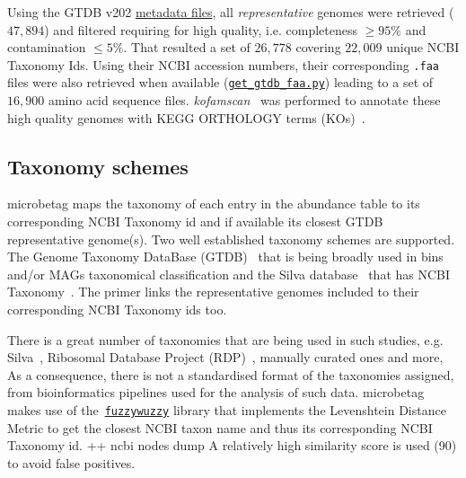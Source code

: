 \documentclass[sn-mathphys,Numbered]{sn-jnl}%
\theoremstyle{thmstyleone}%
\theoremstyle{thmstyletwo}%
\theoremstyle{thmstylethree}%
\begin{document}
        Using the GTDB v202 \href{https://data.gtdb.ecogenomic.org/releases/release202/202.0/}{metadata files}, 
        all \textit{representative} genomes were retrieved ($47,894$) and filtered requiring for high quality, i.e. completeness $\geq 95\%$  and contamination $\leq 5\%$.
        That resulted a set of $26,778$ covering $22,009$ unique NCBI Taxonomy Ids.
        Using their NCBI accession numbers, their corresponding \texttt{.faa} files were also retrieved when available 
        (\href{https://github.com/hariszaf/microbetag/blob/develop/microbetagDB/mappings/gtdb_ncbi/get_gtdb_faa.py}{\texttt{get\_gtdb\_faa.py}}) 
        leading to a set of $16,900$ amino acid sequence files.
        \textit{kofamscan}~\cite{aramaki2020kofamkoala} was performed to annotate these high quality genomes with KEGG ORTHOLOGY terms (KOs)~\cite{kanehisa2012kegg}.


    \subsection*{Taxonomy schemes}
        \label{subsec:taxonomies}

        microbetag maps the taxonomy of each entry in the abundance table to its corresponding NCBI Taxonomy id and if available its closest GTDB representative genome(s).
        Two well established taxonomy schemes are supported.
        The Genome Taxonomy DataBase (GTDB)~\cite{parks2022gtdb} that is being broadly used in bins and/or MAGs taxonomical classification
        and the Silva database~\cite{quast2012silva} that has 
        NCBI Taxonomy~\cite{schoch2020ncbi}. 
        The primer links the representative genomes included to their corresponding NCBI Taxonomy ids too. 
        
        There is a great number of taxonomies that are being used in such studies, e.g. Silva~\cite{quast2012silva}, Ribosomal Database Project (RDP)~\cite{cole2014ribosomal}, manually curated ones and more, 
        As a consequence, there is not a standardised format of the taxonomies assigned, from bioinformatics pipelines used for the analysis of such data.
        microbetag makes use of the~\href{https://github.com/seatgeek/thefuzz}{\texttt{fuzzywuzzy}} library that implements the Levenshtein Distance Metric to get the closest NCBI taxon name and thus its corresponding NCBI Taxonomy id. 
        ++ ncbi nodes dump
        A relatively high similarity score is used (90) to avoid false positives. 
\end{document}
